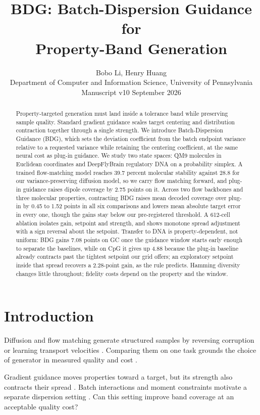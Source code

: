 \documentclass{article}
\title{BDG: Batch-Dispersion Guidance for\\Property-Band Generation}
\author{Bobo Li, Henry Huang\\
Department of Computer and Information Science, University of Pennsylvania\\
\small Manuscript v10 \quad 29 September 2026}
\begin{document}
\maketitle
\begin{abstract}
Property-targeted generation must land inside a tolerance band while preserving sample quality. Standard gradient guidance scales target centering and distribution contraction together through a single strength. We introduce Batch-Dispersion Guidance (BDG), which sets the deviation coefficient from the batch endpoint variance relative to a requested variance while retaining the centering coefficient, at the same neural cost as plug-in guidance. We study two state spaces: QM9 molecules in Euclidean coordinates and DeepFlyBrain regulatory DNA on a probability simplex. A trained flow-matching model reaches 39.7 percent molecular stability against 28.8 for our variance-preserving diffusion model, so we carry flow matching forward, and plug-in guidance raises dipole coverage by 2.75 points on it. Across two flow backbones and three molecular properties, contracting BDG raises mean decoded coverage over plug-in by 0.45 to 1.52 points in all six comparisons and lowers mean absolute target error in every one, though the gains stay below our pre-registered threshold. A 612-cell ablation isolates gain, setpoint and strength, and shows monotone spread adjustment with a sign reversal about the setpoint. Transfer to DNA is property-dependent, not uniform: BDG gains 7.08 points on GC once the guidance window starts early enough to separate the baselines, while on CpG it gives up 4.88 because the plug-in baseline already contracts past the tightest setpoint our grid offers; an exploratory setpoint inside that spread recovers a 2.28-point gain, as the rule predicts. Hamming diversity changes little throughout; fidelity costs depend on the property and the window.
\end{abstract}

\section{Introduction}
Diffusion and flow matching generate structured samples by reversing corruption or learning transport velocities \citep{karras2022elucidating,lipman2022flow}. Comparing them on one task grounds the choice of generator in measured quality and cost \citep{albergo2025stochastic}.

Gradient guidance moves properties toward a target, but its strength also contracts their spread \citep{chung2023dps,song2023lgd}. Batch interactions and moment constraints motivate a separate dispersion setting \citep{corso2024particle,mgd2026moment}. Can this setting improve band coverage at an acceptable quality cost?
\end{document}
